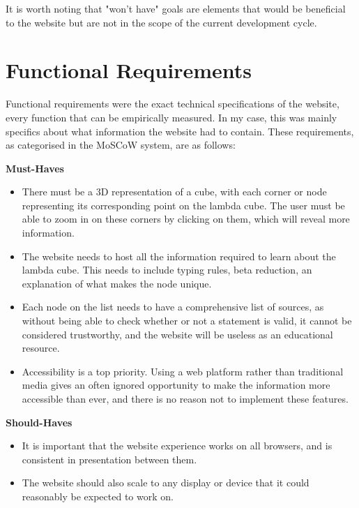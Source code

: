 \documentclass{l4proj}
\begin{document}
It is worth noting that "won't have" goals are elements that would be beneficial to the website but are not in the scope of the current development cycle.

\section{Functional Requirements}

Functional requirements were the exact technical specifications of the website, every function that can be empirically measured.  In my case, this was mainly specifics about what information the website had to contain.  These requirements, as categorised in the MoSCoW system, are as follows:

\textbf{Must-Haves}

\begin{itemize}
    \item There must be a 3D representation of a cube, with each corner or node representing its corresponding point on the lambda cube.  The user must be able to zoom in on these corners by clicking on them, which will reveal more information.

    \item The website needs to host all the information required to learn about the lambda cube.  This needs to include typing rules, beta reduction, an explanation of what makes the node unique.

    \item Each node on the list needs to have a comprehensive list of sources, as without being able to check whether or not a statement is valid, it cannot be considered trustworthy, and the website will be useless as an educational resource.

    \item Accessibility is a top priority.  Using a web platform rather than traditional media gives an often ignored opportunity to make the information more accessible than ever, and there is no reason not to implement these features.
    
\end{itemize}

\textbf{Should-Haves}

\begin{itemize}
    \item It is important that the website experience works on all browsers, and is consistent in presentation between them.
    
    \item The website should also scale to any display or device that it could reasonably be expected to work on.
\end{itemize}
\end{document}

